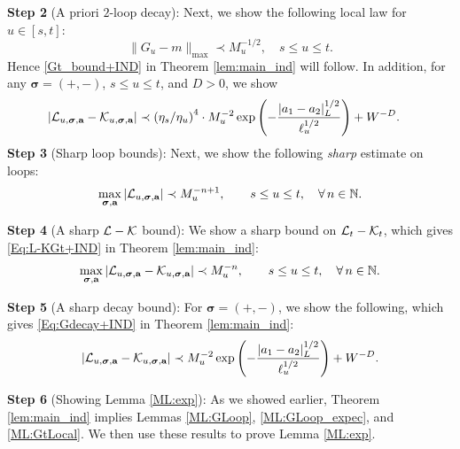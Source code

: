  \bigskip
\noindent 
\textbf{Step 2}  (A priori $2$-loop decay): 
 Next, we show the following local law for $u\in [s,t]$: 
 \begin{equation}\label{Gt_bound_flow}
     \|G_u-m\|_{\max}\prec  M_{u}^{-1/2},\quad s\le u\le t.
\end{equation} 
Hence \eqref{Gt_bound+IND} in Theorem \ref{lem:main_ind} will follow.  
In addition,  for any  
 $\boldsymbol{\sigma}=(+,-)$,   $s\le u\le t$, and $D>0$, we show   
 \begin{equation}\label{Eq:Gdecay_w}
\left| {\cal L}_{u, \boldsymbol{\sigma}, \textbf{a}}-{\cal K}_{u, \boldsymbol{\sigma}, \textbf{a}}\right| \prec \left(\eta_s/\eta_u\right)^4\cdot M_{u}^{-2}\exp \left(- \frac{|a_1-a_2|_{L}^{1/2}}{\ell_u^{1/2}}\right)+W^{-D} . \quad 
\end{equation}
   \bigskip
 \noindent 
\textbf{Step 3}   (Sharp  loop  bounds): 
Next, we show the following \emph{sharp} estimate on loops:
\begin{equation}\label{Eq:LGxb}
\max_{\boldsymbol{\sigma}, \textbf{a}}\left| {\cal L}_{u, \boldsymbol{\sigma}, \textbf{a}} \right|
\prec 
M_{u}^{-n+1} ,\quad \quad s\le u\le t, \quad\forall\, n\in \mathbb N.
\end{equation}


 \bigskip
 \noindent 
\textbf{Step 4}  (A sharp  $\cal L - \cal K$  bound): 
We show a sharp bound on ${\cal L}_{t}-{\cal K}_{t}$, which gives \eqref{Eq:L-KGt+IND} in Theorem  \ref{lem:main_ind}:
\begin{equation}\label{Eq:L-KGt-flow}
 \max_{\boldsymbol{\sigma}, \textbf{a}}\left|{\cal L}_{u, \boldsymbol{\sigma}, \textbf{a}}-{\cal K}_{u, \boldsymbol{\sigma}, \textbf{a}}\right|\prec M_{u}^{-n},\quad \quad s\le u\le t, \quad \forall\, n\in \mathbb N.
\end{equation}



 \bigskip
 \noindent 
\textbf{Step 5}  (A sharp decay bound): For  $ \boldsymbol{\sigma}=(+,-)$, we show the following, which gives \eqref{Eq:Gdecay+IND} in Theorem  \ref{lem:main_ind}:
 \begin{equation}\label{Eq:Gdecay_flow}
\left| {\cal L}_{u, \boldsymbol{\sigma}, \textbf{a}}-{\cal K}_{u, \boldsymbol{\sigma}, \textbf{a}}\right| \prec   M_{u}^{-2}\exp \left(- \frac{|a_1-a_2|_{L}^{1/2}}{\ell_u^{1/2}}\right)+W^{-D}. 
\end{equation}



 \bigskip
 \noindent 
\textbf{Step 6}  (Showing Lemma \ref{ML:exp}): As we showed earlier, Theorem \ref{lem:main_ind} implies Lemmas \ref{ML:GLoop}, \ref{ML:GLoop_expec}, and \ref{ML:GtLocal}. We then use these results to prove Lemma \ref{ML:exp}.


